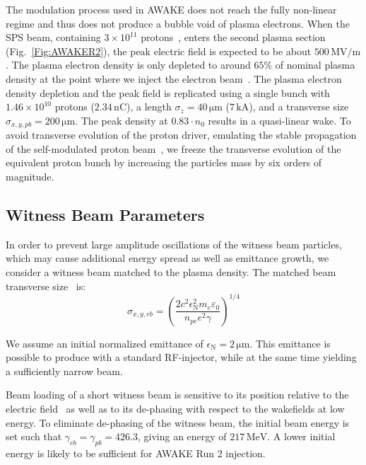 \documentclass[aps,prstab,reprint,amsmath,amssymb,groupedaddress]{revtex4-1}
\newcommand{\unit}[1]{\,\mathrm{#1}}
\newcommand{\funit}[2]{\,\mathrm{#1}/\mathrm{#2}}
\newcommand{\nexp}[1]{\times 10^{#1}}
\begin{document}
The modulation process used in AWAKE does not reach the fully non-linear regime and thus does not produce a bubble void
of plasma electrons. When the SPS beam, containing $3\nexp{11}$ protons~\cite{gschwendtner:2016}, enters the second
plasma section (Fig.~\ref{Fig:AWAKER2}), the peak electric field is expected to be about $500\funit{MV}{m}$. The
plasma electron density is only depleted to around $65\%$ of nominal plasma density at the point where we inject the
electron beam~\cite{awake_collaboration:2016}. The plasma electron density depletion and the peak field is replicated
using a single bunch with $1.46\nexp{10}$ protons ($2.34\unit{nC}$), a length $\sigma_{z} = 40\unit{\mu m}$
($7\unit{kA}$), and a transverse size $\sigma_{x,y,pb} = 200\unit{\mu m}$. The peak density at $0.83\cdot n_{0}$ results
in a quasi-linear wake. To avoid transverse evolution of the proton driver, emulating the stable propagation of the
self-modulated proton beam~\cite{lotov:2011, lotov:2015, caldwell:2011}, we freeze the transverse evolution of the
equivalent proton bunch by increasing the particles mass by six orders of magnitude.

\subsection{Witness Beam Parameters}\label{S:M:Setup}

In order to prevent large amplitude oscillations of the witness beam particles, which may cause additional energy spread
as well as emittance growth, we consider a witness beam matched to the plasma density. The matched beam transverse
size~\cite{esarey:1996} is:
\begin{equation}
    \sigma_{x,y,eb}=\left(\frac{2c^{2}\epsilon_{\mathrm{N}}^{2}m_{e}\varepsilon_{0}}{n_{pe}e^{2}\gamma}\right)^{1/4}
    \label{EQ:Matched}
\end{equation}

We assume an initial normalized emittance of $\epsilon_{\mathrm{N}} = 2\unit{\mu m}$. This emittance is possible to
produce with a standard RF-injector, while at the same time yielding a sufficiently narrow beam.

Beam loading of a short witness beam is sensitive to its position relative to the electric field~\cite{tzoufras:2009}
as well as to its de-phasing with respect to the wakefields at low energy. To eliminate de-phasing of the witness beam,
the initial beam energy is set such that $\gamma_{eb} = \gamma_{pb} = 426.3$, giving an energy of $217\unit{MeV}$. A
lower initial energy is likely to be sufficient for AWAKE Run 2 injection.
\end{document}

